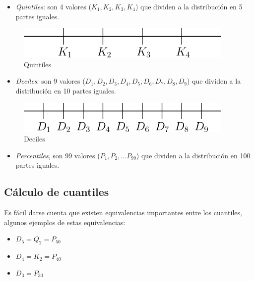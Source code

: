 \documentclass[letterpaper,]{book}
\providecommand{\tightlist}{%
  \setlength{\itemsep}{0pt}\setlength{\parskip}{0pt}}
\begin{document}
\begin{itemize}
\tightlist
\item
  \emph{Quintiles}: son 4 valores (\(K_{1}, K_{2}, K_{3}, K_{4}\)) que dividen a la distribución en 5 partes iguales.
\end{itemize}

\begin{figure}[!h]

{\centering \includegraphics[width=0.5\linewidth]{quintiles} 

}

\caption{Quintiles}\label{fig:quint}
\end{figure}

\begin{itemize}
\tightlist
\item
  \emph{Deciles}: son 9 valores (\(D_1, D_2, D_3, D_4, D_5, D_6, D_7, D_8, D_9\)) que dividen a la distribución en 10 partes iguales.
\end{itemize}

\begin{figure}[!h]

{\centering \includegraphics[width=0.5\linewidth]{deciles} 

}

\caption{Deciles}\label{fig:decil}
\end{figure}

\begin{itemize}
\tightlist
\item
  \emph{Percentiles}, son 99 valores (\(P_1, P_2, \ldots P_{99}\)) que dividen a la distribución en 100 partes iguales.
\end{itemize}

\hypertarget{calculo-de-cuantiles}{%
\subsection{Cálculo de cuantiles}\label{calculo-de-cuantiles}}

Es fácil darse cuenta que existen equivalencias importantes entre los cuantiles, algunos ejemplos de estas equivalencias:

\begin{itemize}
\tightlist
\item
  \(D_5=Q_2=P_{50}\)
\item
  \(D_4=K_2=P_{40}\)
\item
  \(D_3=P_{30}\)
\end{itemize}
\end{document}
